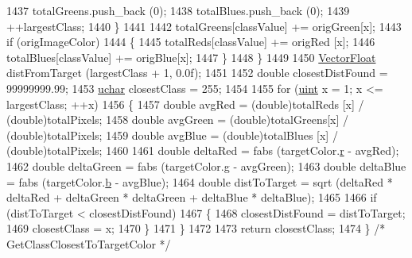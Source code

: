\begin{DoxyCode}
1437       totalGreens.push\_back (0);
1438       totalBlues.push\_back  (0);
1439       ++largestClass;
1440     \}
1441 
1442     totalGreens[classValue] += origGreen[x];
1443     \textcolor{keywordflow}{if}  (origImageColor)
1444     \{
1445       totalReds[classValue]  += origRed [x];
1446       totalBlues[classValue] += origBlue[x];
1447     \}
1448   \}
1449 
1450   \hyperlink{namespace_k_k_b_a4820c3670ee1fe74f0c4de981c600faf}{VectorFloat} distFromTarget (largestClass + 1, 0.0f);
1451 
1452   \textcolor{keywordtype}{double}  closestDistFound = 99999999.99;
1453   \hyperlink{namespace_k_k_b_ace9969169bf514f9ee6185186949cdf7}{uchar}   closestClass = 255;
1454 
1455   \textcolor{keywordflow}{for}  (\hyperlink{namespace_k_k_b_ab8557ae1b1f2361659d82a890e2f8014}{uint} x = 1;  x <= largestClass;  ++x)
1456   \{
1457     \textcolor{keywordtype}{double} avgRed   = (double)totalReds  [x] / (\textcolor{keywordtype}{double})totalPixels;
1458     \textcolor{keywordtype}{double} avgGreen = (double)totalGreens[x] / (\textcolor{keywordtype}{double})totalPixels;
1459     \textcolor{keywordtype}{double} avgBlue  = (double)totalBlues [x] / (\textcolor{keywordtype}{double})totalPixels;
1460 
1461     \textcolor{keywordtype}{double}  deltaRed   = fabs (targetColor.\hyperlink{class_k_k_b_1_1_pixel_value_a734e16b4afd9a270df67aa1ce726e2d0}{r} - avgRed);
1462     \textcolor{keywordtype}{double}  deltaGreen = fabs (targetColor.\hyperlink{class_k_k_b_1_1_pixel_value_ab9b7056f3cf6f67a5987a8119ceaab67}{g} - avgGreen);
1463     \textcolor{keywordtype}{double}  deltaBlue  = fabs (targetColor.\hyperlink{class_k_k_b_1_1_pixel_value_ac43e49760f71b756dba6c40e80e7917a}{b} - avgBlue);
1464     \textcolor{keywordtype}{double}  distToTarget = sqrt (deltaRed * deltaRed + deltaGreen * deltaGreen + deltaBlue * deltaBlue);
1465 
1466     \textcolor{keywordflow}{if}  (distToTarget < closestDistFound)
1467     \{
1468       closestDistFound = distToTarget;
1469       closestClass = x;
1470     \}
1471   \}
1472 
1473   \textcolor{keywordflow}{return}  closestClass;
1474 \}  \textcolor{comment}{/* GetClassClosestToTargetColor */}
\end{DoxyCode}
